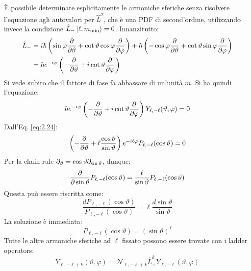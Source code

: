 È possibile determinare esplicitamente le armoniche sferiche senza risolvere l'equazione agli autovalori per $ \hat{L}^2 $, che è una PDF di second'ordine, utilizzando invece la condizione $ \hat{L}_- \ket{\ell,m_{\text{min}}} = 0 $. Innanzitutto:
\begin{equation}
	\begin{split}
		\hat{L}_-
		&= i\hbar \left( \sin \varphi \frac{\partial}{\partial \vartheta} + \cot \vartheta \cos \varphi \frac{\partial}{\partial \varphi} \right) + \hbar \left( -\cos \varphi \frac{\partial}{\partial \vartheta} + \cot \vartheta \sin \varphi \frac{\partial}{\partial \varphi} \right)\\
		&= \hbar e^{-i\varphi} \left( -\frac{\partial}{\partial \vartheta} + i \cot \vartheta \frac{\partial}{\partial \varphi} \right)
	\end{split}
	\label{eq:2.26}
\end{equation}
Si vede subito che il fattore di fase fa abbassare di un'unità $ m $. Si ha quindi l'equazione:
\begin{equation}
	\hbar e^{-i\varphi} \left( - \frac{\partial}{\partial \vartheta} + i \cot \vartheta \frac{\partial}{\partial \varphi} \right) Y_{\ell,-\ell} (\vartheta,\varphi) = 0
	\label{eq:2.27}
\end{equation}
Dall'Eq. \ref{eq:2.24}:
\begin{equation}
	\left( -\frac{\partial}{\partial \vartheta} + \ell \frac{\cos \vartheta}{\sin \vartheta} \right) e^{-i\ell\varphi} P_{\ell,-\ell}(\cos \vartheta) = 0
	\label{eq:2.28}
\end{equation}
Per la chain rule $ \partial_{\vartheta} = \cos \vartheta \partial_{\sin \vartheta} $, dunque:
\begin{equation}
	\frac{\partial}{\partial \sin \vartheta} P_{\ell,-\ell}(\cos \vartheta) = \frac{\ell}{\sin \vartheta} P_{\ell,-\ell}(\cos \vartheta)
	\label{eq:2.29}
\end{equation}
Questa può essere riscritta come:
\begin{equation}
	\frac{dP_{\ell,-\ell}(\cos \vartheta)}{P_{\ell,-\ell}(\cos \vartheta)} = \ell \frac{d\sin \vartheta}{\sin \vartheta}
	\label{eq:2.30}
\end{equation}
La soluzione è immediata:
\begin{equation}
	P_{\ell,-\ell}(\cos \vartheta) = \left( \sin \vartheta \right)^{\ell}
	\label{eq:2.31}
\end{equation}
Tutte le altre armoniche sferiche ad $ \ell $ fissato possono essere trovate con i ladder operators:
\begin{equation}
	Y_{\ell,-\ell+k}(\vartheta,\varphi) = \mathcal{N}_{\ell,-\ell+k} \hat{L}_+^k Y_{\ell,-\ell}(\vartheta,\varphi)
	\label{eq:2.32}
\end{equation}
